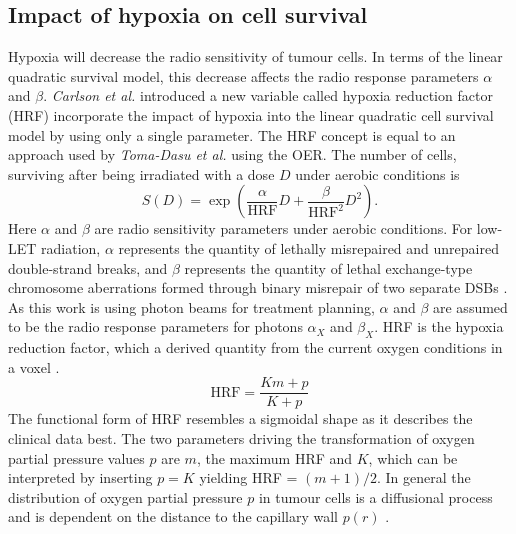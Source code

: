 \subsection{Impact of hypoxia on cell survival}
Hypoxia will decrease the radio sensitivity of tumour cells. In terms of the linear quadratic survival model, this decrease affects the radio response parameters $\alpha$ and $\beta$. \textit{Carlson et al.} \cite{pmid17022202} introduced a new variable called hypoxia reduction factor (HRF) incorporate the impact of hypoxia into the linear quadratic cell survival model by using only a single parameter. The HRF concept is equal to an approach used by \textit{Toma-Dasu et al.} \cite{pmid21871003} using the OER. The number of cells, surviving after being irradiated with a dose $D$ under aerobic conditions is
\begin{equation}
S(D) = \exp\left(\frac{\alpha}{\mathrm{HRF}}D + \frac{\beta}{\mathrm{HRF}^2}D^2\right).
\end{equation}
Here $\alpha$ and $\beta$ are radio sensitivity parameters under aerobic conditions. For low-LET radiation, $\alpha$ represents the quantity of lethally misrepaired and unrepaired double-strand breaks, and $\beta$ represents the quantity of lethal exchange-type chromosome aberrations formed through binary misrepair of two separate DSBs \cite{pmid18363426}. As this work is using photon beams for treatment planning, $\alpha$ and $\beta$ are assumed to be the radio response parameters for photons $\alpha_X$ and $\beta_X$. HRF is the hypoxia reduction factor, which a derived quantity from the current oxygen conditions in a voxel \cite{pmid21183291}.
\begin{equation}\label{eq:hrfmodel}
\mathrm{HRF} = \frac{Km + p}{K+p}
\end{equation}
The functional form of HRF resembles a sigmoidal shape as it describes the clinical data best. The two parameters driving the transformation of oxygen partial pressure values $p$ are $m$, the maximum HRF and $K$, which can be interpreted by inserting $p=K$ yielding HRF = $(m+1)/2$. In general the distribution of oxygen partial pressure $p$ in tumour cells is a diffusional process and is dependent on the distance to the capillary wall $p(r)$ \cite{pmid5067983}.

